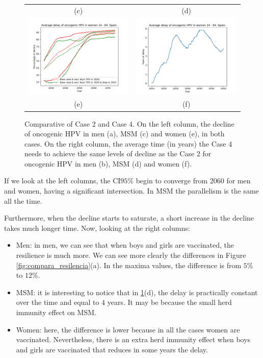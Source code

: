 \begin{figure}[!]
\begin{tabular}{cc}
		(c)	& (d) \\
		\includegraphics[width=0.5\linewidth]{IMGs/11.-Resilencia/2_y_4/decline_onco_muj.pdf}	& 
		\includegraphics[width=0.5\linewidth]{IMGs/11.-Resilencia/2_y_4/resilencia_onco_muj.pdf}  \\ 
		(e)	& (f) \\  
	\end{tabular} 
	\caption{Comparative of Case 2 and Case 4. On the left column, the decline of oncogenic HPV in men (a), MSM (c) and women (e), in both cases. On the right column, the average time (in years) the Case 4 needs to achieve the same levels of decline as the Case 2 for oncogenic HPV in men (b), MSM (d) and women (f).}
	\label{fig:Case2_Case4}
\end{figure}

If we look at the left columns, the CI$95\%$ begin to converge from $2060$ for men and women, having a significant intersection. In MSM the parallelism is the same all the time.

Furthermore, when the decline starts to saturate, a short increase in the decline takes much longer time. Now, looking at the right columns:

\begin{itemize}
\item Men: in men, we can see that when boys and girls are vaccinated, the resilience is much more. We can see more clearly the differences in Figure \ref{fig:compara_resilencia}(a). In the maxima values, the difference is from $5\%$ to $12\%$.
\item MSM: it is interesting to notice that in \ref{fig:Case2_Case4}(d), the delay is practically constant over the time and equal to $4$ years. It may be because the small herd immunity effect on MSM.
\item Women: here, the difference is lower because in all the cases women are vaccinated. Nevertheless, there is an extra herd immunity effect when boys and girls are vaccinated that reduces in some years the delay.
\end{itemize}

